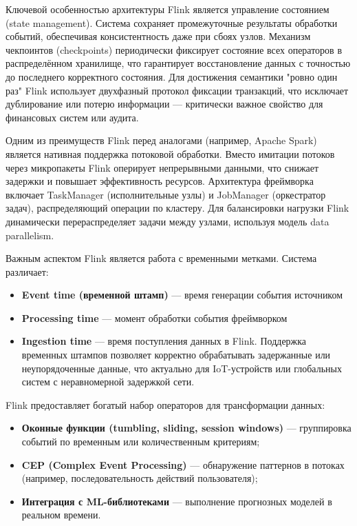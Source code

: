             
            Ключевой особенностью архитектуры Flink является управление состоянием (state management). Система сохраняет промежуточные результаты обработки событий, обеспечивая консистентность даже при сбоях узлов. Механизм чекпоинтов (checkpoints) периодически фиксирует состояние всех операторов в распределённом хранилище, что гарантирует восстановление данных с точностью до последнего корректного состояния. Для достижения семантики "ровно один раз" Flink использует двухфазный протокол фиксации транзакций, что исключает дублирование или потерю информации — критически важное свойство для финансовых систем или аудита.
            
            
            Одним из преимуществ Flink перед аналогами (например, Apache Spark) является нативная поддержка потоковой обработки. Вместо имитации потоков через микропакеты Flink оперирует непрерывными данными, что снижает задержки и повышает эффективность ресурсов. Архитектура фреймворка включает TaskManager (исполнительные узлы) и JobManager (оркестратор задач), распределяющий операции по кластеру. Для балансировки нагрузки Flink динамически перераспределяет задачи между узлами, используя модель data parallelism.
            
            
            Важным аспектом Flink является работа с временными метками. Система различает:
            \begin{itemize}
                \item \textbf{Event time (временной штамп)} — время генерации события источником
                \item \textbf{Processing time} — момент обработки события фреймворком
                \item \textbf{Ingestion time} — время поступления данных в Flink. Поддержка временных штампов позволяет корректно обрабатывать задержанные или неупорядоченные данные, что актуально для IoT-устройств или глобальных систем с неравномерной задержкой сети.
            \end{itemize}
            
            
            Flink предоставляет богатый набор операторов для трансформации данных:
            \begin{itemize}
                \item \textbf{Оконные функции (tumbling, sliding, session windows)} — группировка событий по временным или количественным критериям;
                \item \textbf{CEP (Complex Event Processing)} — обнаружение паттернов в потоках (например, последовательность действий пользователя);
                \item \textbf{Интеграция с ML-библиотеками} — выполнение прогнозных моделей в реальном времени.
            \end{itemize}

